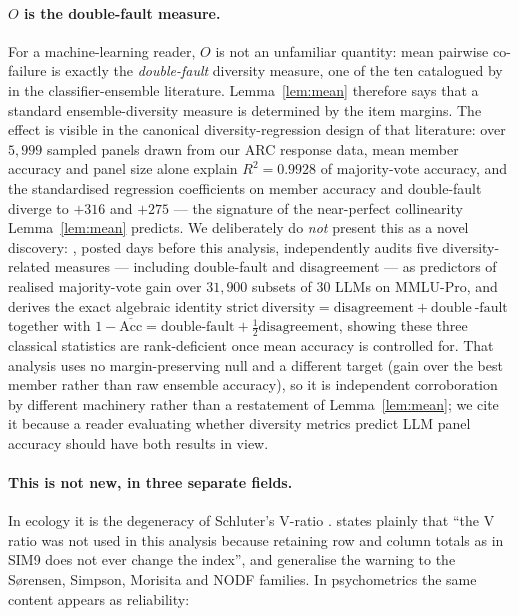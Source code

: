 \documentclass[pdflatex,sn-mathphys-ay]{sn-jnl}
\theoremstyle{thmstyleone}
\theoremstyle{thmstylethree}
\begin{document}
\paragraph{$O$ is the double-fault measure.} For a machine-learning reader, $O$ is not an unfamiliar
quantity: mean pairwise co-failure is exactly the \emph{double-fault} diversity measure, one of the
ten catalogued by \citet{kuncheva2003} in the classifier-ensemble literature. Lemma~\ref{lem:mean}
therefore says that a standard ensemble-diversity measure is determined by the item margins. The
effect is visible in the canonical diversity-regression design of that literature: over $5{,}999$
sampled panels drawn from our ARC response data, mean member accuracy and panel size alone explain
$R^2=0.9928$ of majority-vote accuracy, and the standardised regression coefficients on member
accuracy and double-fault diverge to $+316$ and $+275$ --- the signature of the near-perfect
collinearity Lemma~\ref{lem:mean} predicts. We deliberately do \emph{not} present this as a novel
discovery: \citet{kim2026diversity}, posted days before this analysis, independently audits five
diversity-related measures --- including double-fault and disagreement --- as predictors of
realised majority-vote gain over $31{,}900$ subsets of $30$ LLMs on MMLU-Pro, and derives the
exact algebraic identity $\mathrm{strict\ diversity} = \mathrm{disagreement} + \mathrm{double\
\text{-}fault}$ together with $1-\overline{\mathrm{Acc}} = \mathrm{double\text{-}fault} +
\tfrac12\mathrm{disagreement}$, showing these three classical statistics are rank-deficient once
mean accuracy is controlled for. That analysis uses no margin-preserving null and a different
target (gain over the best member rather than raw ensemble accuracy), so it is independent
corroboration by different machinery rather than a restatement of Lemma~\ref{lem:mean}; we cite it
because a reader evaluating whether diversity metrics predict LLM panel accuracy should have both
results in view.

\paragraph{This is not new, in three separate fields.} In ecology it is the degeneracy of
Schluter's V-ratio \citep{schluter1984}. \citet{gotelli2000} states plainly that ``the V ratio
was not used in this analysis because retaining row and column totals as in SIM9 does not ever
change the index'', and \citet{gotelliulrich2012} generalise the warning to the S\o rensen,
Simpson, Morisita and NODF families. In psychometrics the same content appears as reliability:
\end{document}
